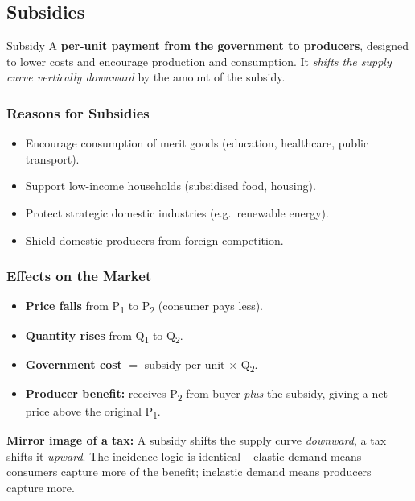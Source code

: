 \documentclass[11pt, a4paper, twoside]{book}
\begin{document}
\subsection{Subsidies}

\begin{keyterm}{Subsidy}
A \textbf{per-unit payment from the government to producers}, designed to lower costs and encourage production and consumption. It \emph{shifts the supply curve vertically downward} by the amount of the subsidy.
\end{keyterm}

\subsubsection{Reasons for Subsidies}

\begin{itemize}
  \item Encourage consumption of merit goods (education, healthcare, public transport).
  \item Support low-income households (subsidised food, housing).
  \item Protect strategic domestic industries (e.g.\ renewable energy).
  \item Shield domestic producers from foreign competition.
\end{itemize}

\subsubsection{Effects on the Market}

\begin{itemize}
  \item \textbf{Price falls} from P\textsubscript{1} to P\textsubscript{2} (consumer pays less).
  \item \textbf{Quantity rises} from Q\textsubscript{1} to Q\textsubscript{2}.
  \item \textbf{Government cost} $=$ subsidy per unit $\times$ Q\textsubscript{2}.
  \item \textbf{Producer benefit:} receives P\textsubscript{2} from buyer \emph{plus} the subsidy, giving a net price above the original P\textsubscript{1}.
\end{itemize}

\begin{tcolorbox}[enhanced,colback=LightGold,colframe=GoldAccent,arc=0pt,boxrule=0.9pt,
  left=8pt,right=8pt,top=6pt,bottom=6pt]
\textbf{\color{NavyPrimary}Mirror image of a tax:} A subsidy shifts the supply curve \emph{downward}, a tax shifts it \emph{upward}. The incidence logic is identical -- elastic demand means consumers capture more of the benefit; inelastic demand means producers capture more.
\end{tcolorbox}
\end{document}
